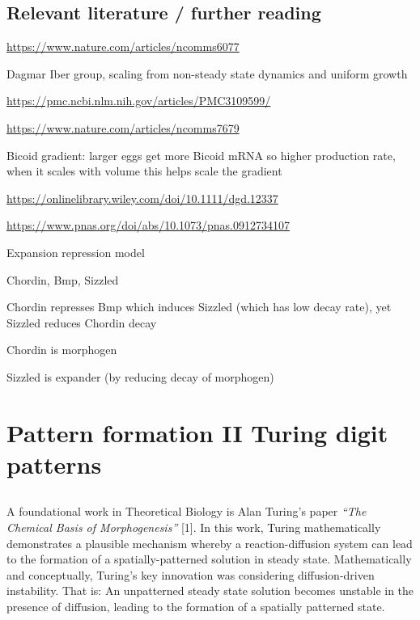 \documentclass[
  letterpaper,
  DIV=11,
  numbers=noendperiod]{scrreprt}
\theoremstyle{definition}
\theoremstyle{remark}
\begin{document}
\section{Relevant literature / further
reading}\label{relevant-literature-further-reading}

\url{https://www.nature.com/articles/ncomms6077}

Dagmar Iber group, scaling from non-steady state dynamics and uniform
growth

\url{https://pmc.ncbi.nlm.nih.gov/articles/PMC3109599/}

\url{https://www.nature.com/articles/ncomms7679}

Bicoid gradient: larger eggs get more Bicoid mRNA so higher production
rate, when it scales with volume this helps scale the gradient

\url{https://onlinelibrary.wiley.com/doi/10.1111/dgd.12337}

\url{https://www.pnas.org/doi/abs/10.1073/pnas.0912734107}

Expansion repression model

Chordin, Bmp, Sizzled

Chordin represses Bmp which induces Sizzled (which has low decay rate),
yet Sizzled reduces Chordin decay

Chordin is morphogen

Sizzled is expander (by reducing decay of morphogen)

\chapter{\texorpdfstring{Pattern formation II Turing digit
patterns}{Pattern formation II   Turing digit patterns}}\label{pattern-formation-ii-turing-digit-patterns}

\section*{}\label{section}

\markright{}

A foundational work in Theoretical Biology is Alan Turing's paper
\emph{``The Chemical Basis of Morphogenesis''} {[}1{]}. In this work,
Turing mathematically demonstrates a plausible mechanism whereby a
reaction-diffusion system can lead to the formation of a
spatially-patterned solution in steady state. Mathematically and
conceptually, Turing's key innovation was considering diffusion-driven
instability. That is: An unpatterned steady state solution becomes
unstable in the presence of diffusion, leading to the formation of a
spatially patterned state.
\end{document}
